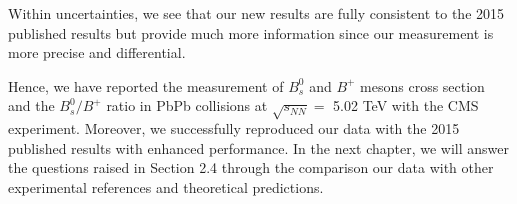 Within uncertainties, we see that our new results are fully consistent to the 2015 published results but provide much more information since our measurement is more precise and differential.  

Hence, we have reported the measurement of $B^0_s$ and $B^+$ mesons cross section and the $B^0_s/B^+$ ratio in PbPb collisions at $\sqrt{s_{NN}} =$ 5.02 TeV with the CMS experiment. Moreover, we successfully reproduced our data with the 2015 published results with enhanced performance. In the next chapter, we will answer the questions raised in Section 2.4 through the comparison our data with other experimental references and theoretical predictions. 



